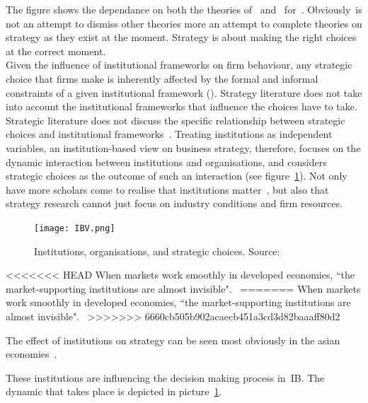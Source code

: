 The figure shows the dependance on both the theories of~\cite{Barney:2001} and~\cite{Porter:1980} for~\ibv. Obviously~\ibv is not an attempt to dismiss other theories more an attempt to complete theories on strategy as they exist at the moment. Strategy is about making the right choices at the correct moment. \\
Given the influence of institutional frameworks on firm behaviour, any strategic choice that firms make is inherently affected by the formal and informal constraints of a given institutional framework (\cite{North:1990,Oliver:1997}). 
Strategy literature does not take into account the institutional frameworks that influence the choices \mne have to take. 
Strategic literature does not discuss the specific relationship between strategic choices and institutional frameworks~\cite{Peng:2008}.
Treating institutions as independent variables, an institution-based view on business strategy, therefore, focuses on the dynamic interaction between institutions and organisations, and considers strategic choices as the outcome of such an interaction (see figure~\ref{fig:ibv})\cite{Peng:2002}.
Not only have more scholars come to realise that institutions matter~\cite{Powell:1991,Scott:1995}, but also that strategy research cannot just focus on industry conditions and firm resources.~\cite{Khanna:1997}\\


%


\begin{figure}[htbp!]
	\centering
	\texttt{[image: IBV.png]}
 	\caption{Institutions, organisations, and strategic choices. Source:~\cite{Peng:2000}}
 	\label{fig:ibv}
\end{figure}



<<<<<<< HEAD
When markets work smoothly in developed economies, ``the market-supporting institutions are almost invisible".~\cite{mcMillan:2007}
=======
When markets work smoothly in developed economies, ``the market-supporting institutions are almost invisible".~\cite{McMillan:2007}
>>>>>>> 6660cb505b902acaecb451a3cd3d82baaaff80d2


The effect of institutions on strategy can be seen most obviously in the asian economies~\cite{Peng:2002}.











These institutions are influencing the decision making process in~\gls{IB}.  The dynamic that takes place is depicted in picture~\ref{fig:ibv}. 


